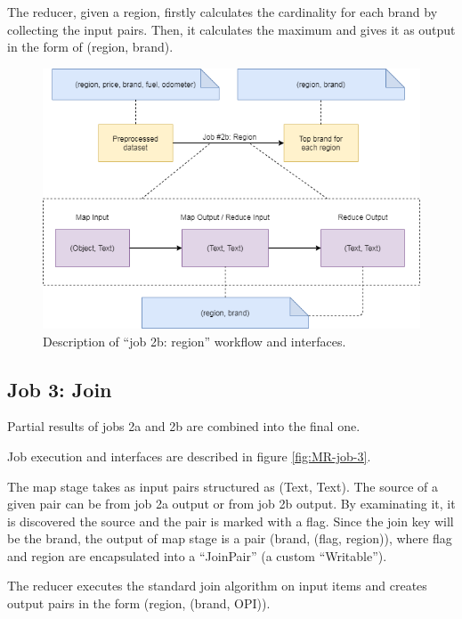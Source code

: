 The reducer, given a region, firstly calculates the cardinality for each brand by collecting the input pairs. Then, it calculates the maximum and gives it as output in the form of (region, brand).

\begin{figure}[H]
	\centering
	\includegraphics[scale=0.7]{images/2-mapreduce/MR-job-2b.png}
	\caption{Description of ``job 2b: region'' workflow and interfaces.}
	\label{fig:MR-job-2b}
\end{figure}  

\subsection{Job 3: Join}

Partial results of jobs 2a and 2b are combined into the final one. 

Job execution and interfaces are described in figure \ref{fig:MR-job-3}.

The map stage takes as input pairs structured as (Text, Text). The source of a given pair can be from job 2a output or from job 2b output. By examinating it, it is discovered the source and the pair is marked with a flag.
Since the join key will be the brand, the output of map stage is a pair (brand, (flag, region)), where flag and region are encapsulated into a ``JoinPair'' (a custom ``Writable'').

The reducer executes the standard join algorithm on input items and creates output pairs in the form (region, (brand, OPI)). 

